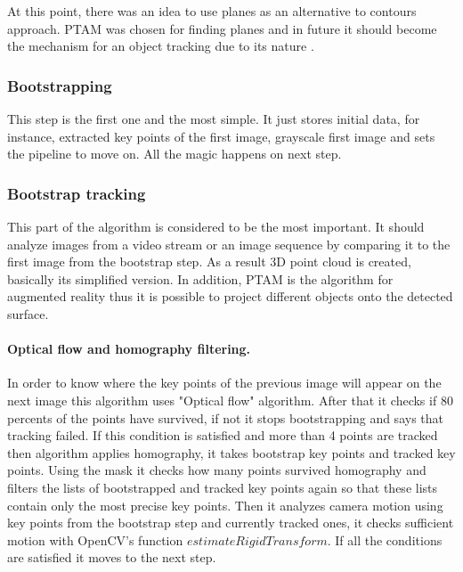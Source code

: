 \documentclass[../../main]{subfiles}
\begin{document}
At this point, there was an idea to use planes as an alternative to contours approach. \ac{PTAM} was chosen for finding planes and in future it should become the mechanism for an object tracking due to its nature \cite{puzzle_games_solver_q3_zakharov}.

\subsubsection{Bootstrapping}

This step is the first one and the most simple. It just stores initial data, for instance, extracted key points of the first image, grayscale first image and sets the pipeline to move on. All the magic happens on next step.

\subsubsection{Bootstrap tracking}

This part of the algorithm is considered to be the most important. It should analyze images from a video stream or an image sequence by comparing it to the first image from the bootstrap step. As a result 3D point cloud is created, basically its simplified version. In addition, \ac{PTAM} is the algorithm for augmented reality thus it is possible to project different objects onto the detected surface.

\paragraph*{Optical flow and homography filtering.}

In order to know where the key points of the previous image will appear on the next image this algorithm uses "Optical flow" algorithm. After that it checks if 80 percents of the points have survived, if not it stops bootstrapping and says that tracking failed. If this condition is satisfied and more than 4 points are tracked then algorithm applies homography, it takes bootstrap key points and tracked key points. Using the mask it checks how many points survived homography and filters the lists of bootstrapped and tracked key points again so that these lists contain only the most precise key points. Then it analyzes camera motion using key points from the bootstrap step and currently tracked ones, it checks sufficient motion with \ac{OpenCV}'s function $estimateRigidTransform$. If all the conditions are satisfied it moves to the next step.
\end{document}
